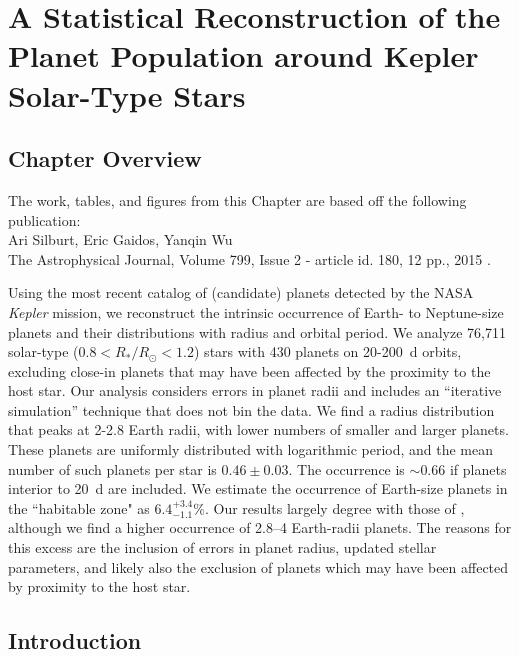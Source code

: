 \chapter[Statistical Reconstruction of Kepler Planets]{A Statistical Reconstruction of the Planet Population around Kepler Solar-Type Stars}
\label{chap:Stats}

\section{Chapter Overview}
	\begin{center}
	\begin{minipage}[c]{4.75in}
	The work, tables, and figures from this Chapter are based off the following publication:\\
	
	Ari Silburt, Eric Gaidos, Yanqin Wu\\
	The Astrophysical Journal, Volume 799, Issue 2 - article id. 180, 12 pp., 2015 \citep{Silburt2015}.
	\vspace{2em}
	\end{minipage}
	\end{center}

Using the most recent catalog of (candidate) planets detected by the
NASA {\it Kepler} mission, we reconstruct the intrinsic occurrence of Earth- to
Neptune-size planets and their distributions with radius and orbital
period.  We analyze 76,711 solar-type ($0.8<R_*/R_{\odot}<1.2 $) stars with 430 planets 
on 20-200~d orbits, excluding close-in planets that may have been affected by
the proximity to the host star.  Our analysis considers errors in
planet radii and includes an ``iterative simulation'' technique that
does not bin the data.  We find a radius distribution that peaks at
2-2.8 Earth radii, with lower numbers of smaller and larger planets.
These planets are uniformly distributed with logarithmic period, and
the mean number of such planets per star is $0.46 \pm 0.03$.  The
occurrence is $\sim 0.66$ if planets interior to 20~d are included.  We
estimate the occurrence of Earth-size planets in the ``habitable zone"
as $6.4^{+3.4}_{-1.1} \%$.  Our results largely degree with those of \cite{Petigura2013}, 
although we find a higher occurrence of 2.8--4
Earth-radii planets. The reasons for this excess are the inclusion of errors in 
planet radius, updated \cite{Huber2014} stellar parameters, and likely also the 
exclusion of planets which may have been affected by proximity to the host star.

\section{Introduction}
\label{sec:introduction}


